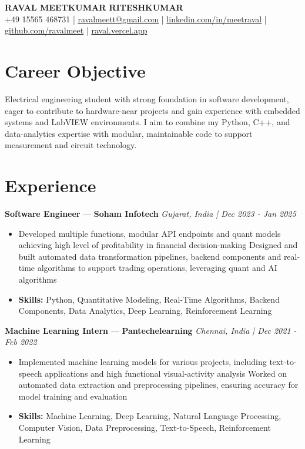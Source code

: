 \documentclass[a4paper,10pt]{article}
\begin{document}
\begin{center}
  {\Large\bfseries RAVAL MEETKUMAR RITESHKUMAR}\\[2pt]
  {\small +49 15565 468731 \;|\; \href{mailto:ravalmeett@gmail.com}{ravalmeett@gmail.com} \;|\; \href{https://www.linkedin.com/in/meetraval/}{linkedin.com/in/meetraval} \;|\; \href{https://github.com/ravalmeet}{github.com/ravalmeet} \;|\; \href{https://raval.vercel.app/}{raval.vercel.app}}
\end{center}
\vspace{-3pt}

\section*{Career Objective}
Electrical engineering student with strong foundation in software development, eager to contribute to hardware-near projects and gain experience with embedded systems and LabVIEW environments. I aim to combine my Python, C++, and data-analytics expertise with modular, maintainable code to support measurement and circuit technology.\par

\section*{Experience}
\textbf{Software Engineer} — \textbf{Soham Infotech} \hfill \textit{Gujarat, India \;|\; Dec 2023 - Jan 2025}\par
\vspace{1pt}
\begin{itemize}
  \item Developed multiple functions, modular API endpoints and quant models achieving high level of profitability in financial decision-making Designed and built automated data transformation pipelines, backend components and real-time algorithms to support trading operations, leveraging quant and AI algorithms
  \item \textbf{Skills:} Python, Quantitative Modeling, Real-Time Algorithms, Backend Components, Data Analytics, Deep Learning, Reinforcement Learning
\end{itemize}
\vspace{3pt}
\textbf{Machine Learning Intern} — \textbf{Pantechelearning} \hfill \textit{Chennai, India \;|\; Dec 2021 - Feb 2022}\par
\vspace{1pt}
\begin{itemize}
  \item Implemented machine learning models for various projects, including text-to-speech applications and high functional visual-activity analysis Worked on automated data extraction and preprocessing pipelines, ensuring accuracy for model training and evaluation
  \item \textbf{Skills:} Machine Learning, Deep Learning, Natural Language Processing, Computer Vision, Data Preprocessing, Text-to-Speech, Reinforcement Learning
\end{itemize}
\end{document}
